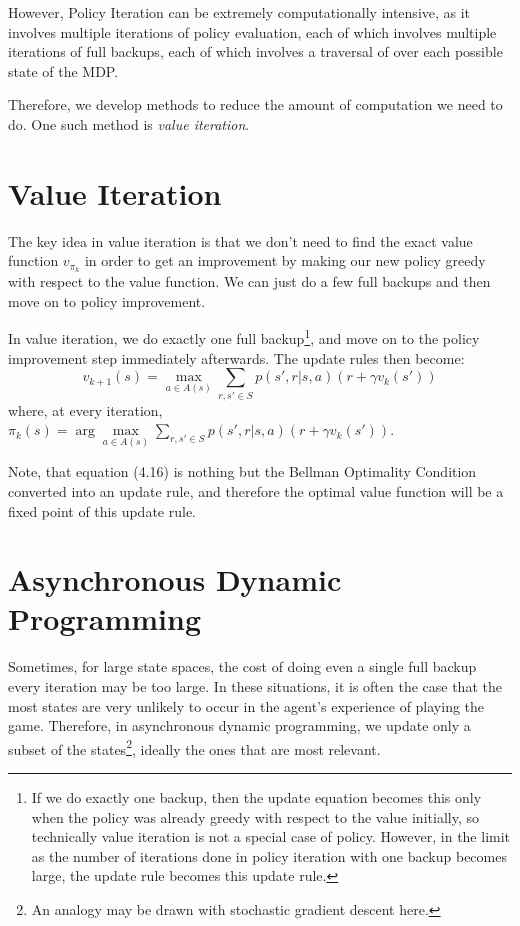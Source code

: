 \documentclass[12pt]{report}
\begin{document}
However, Policy Iteration can be extremely computationally intensive, as it involves multiple iterations of policy evaluation, each of which involves multiple iterations of full backups, each of which involves a traversal of over each possible state of the MDP. 

Therefore, we develop methods to reduce the amount of computation we need to do. One such method is \textit{value iteration}.

\section{Value Iteration}
The key idea in value iteration is that we don't need to find the exact value function $v_{\pi_{k}}$ in order to get an improvement by making our new policy greedy with respect to the value function. We can just do a few full backups and then move on to policy improvement.

In value iteration, we do exactly one full backup\footnote{If we do exactly one backup, then the update equation becomes this only when the policy was already greedy with respect to the value initially, so technically value iteration is not a special case of policy. However, in the limit as the number of iterations done in policy iteration with one backup becomes large, the update rule becomes this update rule.}, and move on to the policy improvement step immediately afterwards. The update rules then become:
\begin{equation}
    v_{k + 1}(s) = \max\limits_{a \in A(s)} \sum\limits_{r, s' \in S} p(s', r | s, a) (r + \gamma v_{k}(s'))
\end{equation}
where, at every iteration, $\pi_{k}(s) = \arg\max\limits_{a \in A(s)} \sum\limits_{r, s' \in S} p(s', r | s, a) (r + \gamma v_{k}(s'))$.

Note, that equation (4.16) is nothing but the Bellman Optimality Condition converted into an update rule, and therefore the optimal value function will be a fixed point of this update rule.
\section{Asynchronous Dynamic Programming}
Sometimes, for large state spaces, the cost of doing even a single full backup every iteration may be too large. In these situations, it is often the case that the most states are very unlikely to occur in the agent's experience of playing the game. 
Therefore, in asynchronous dynamic programming, we update only a subset of the states\footnote{An analogy may be drawn with stochastic gradient descent here.}, ideally the ones that are most relevant. 
\end{document}
